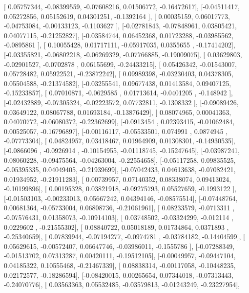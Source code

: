 \documentclass{article}
\begin{document}
       [ 0.05757344, -0.08399559, -0.07608216,  0.01506772, -0.16472617],
       [-0.04511417,  0.05272856,  0.05152619,  0.04301251, -0.1392164 ],
       [ 0.00035159,  0.06017773, -0.04753084, -0.00133123, -0.1103627 ],
       [-0.02781843, -0.07848961,  0.03805421,  0.04077115, -0.21252827],
       [-0.03584744,  0.06452368,  0.01723288, -0.03985562, -0.0895861 ],
       [ 0.10055428,  0.01717111, -0.05917035,  0.0355655 , -0.17414202],
       [-0.03355821, -0.06802218, -0.06269329, -0.07766885, -0.19009075],
       [ 0.03629803, -0.02901527, -0.0702878 ,  0.06155699, -0.24433215],
       [ 0.05426342, -0.01543007,  0.05728482,  0.05922521, -0.23872242],
       [ 0.09989398, -0.03230403,  0.04378305,  0.05504588, -0.21374582],
       [-0.03255541,  0.09677438,  0.01413584,  0.09407125, -0.15233857],
       [ 0.07010871, -0.0629585 ,  0.01713614, -0.0401205 , -0.148942  ],
       [-0.02432889, -0.07305324, -0.02223572,  0.07732811, -0.1308332 ],
       [-0.09089426,  0.03649122,  0.08067788,  0.01693184, -0.13876429],
       [ 0.08074965,  0.00041363,  0.04070772, -0.06080372, -0.22362699],
       [-0.0913454 ,  0.02393415, -0.01062484,  0.00525057, -0.16796897],
       [-0.00116117, -0.05533501,  0.074991  ,  0.0874945 , -0.07773304],
       [ 0.04824957,  0.03418467,  0.01964909,  0.01308301, -0.14930535],
       [-0.0866096 , -0.0926914 , -0.10154955, -0.01118745, -0.15247645],
       [-0.03987241,  0.08060228, -0.09475564, -0.04263004, -0.22554658],
       [-0.05117258,  0.09835525, -0.05395335,  0.04049405, -0.21939699],
       [-0.07042433,  0.04613638, -0.07082421,  0.01934952, -0.21911283],
       [ 0.00739957,  0.07140352,  0.08338074,  0.09413024, -0.10199896],
       [ 0.00195328,  0.03821918, -0.09275793,  0.05527659, -0.1993122 ],
       [-0.01503103, -0.00233013,  0.05667242,  0.04394146, -0.08575514],
       [-0.07448764,  0.00681364, -0.05733004,  0.06808736, -0.21061961],
       [ 0.08233579, -0.0713311 , -0.07576431,  0.01358073, -0.10914103],
       [ 0.03748502, -0.03324299, -0.012114  ,  0.0229602 , -0.21555302],
       [ 0.08840722,  0.05018189,  0.01734864,  0.0371893 , -0.25340659],
       [ 0.07839944, -0.07194277, -0.0974781 , -0.03784182, -0.14404599],
       [ 0.05629615, -0.00572407,  0.06647746, -0.03986011, -0.1555786 ],
       [-0.07288349, -0.01513702,  0.07313287,  0.00420111, -0.19512105],
       [-0.00049957, -0.09447104,  0.04185322,  0.10555468, -0.21467339],
       [ 0.08838314, -0.00117058, -0.10448235,  0.02172577, -0.18286594],
       [-0.08420015,  0.00265654,  0.07344018, -0.07313443, -0.24070776],
       [ 0.03563363,  0.05532485, -0.03579813, -0.01243249, -0.23227954],
\end{document}
